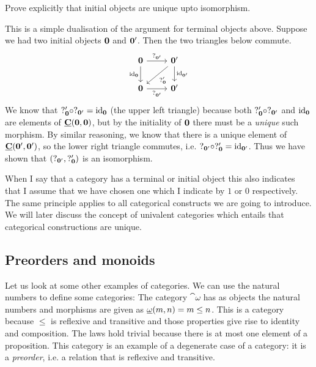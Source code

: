 \begin{Exercise}
  Prove explicitly that initial objects are unique upto isomorphism.
\end{Exercise}
\begin{Answer}
  This is a simple dualisation of the argument for terminal objects above. Suppose we had two initial objects $\bf{0}$ and $\bf{0'}$. Then the two triangles below commute.
  \[\begin{tikzcd}
      \bf{0} \arrow{r}{?_{\bf{0'}}} \arrow[swap]{d}{\id_{\bf 0}} & \bf{0'} \arrow{d}{\id_{\bf 0'}} \arrow{dl}{?'_{\bf{0}}} \\
      \bf{0} \arrow[swap]{r}{?_{\bf{0'}}} & \bf{0'}
  \end{tikzcd}\]
  We know that $?'_{\bf 0}\circ ?_{\bf 0'}=\mathrm{id}_{\bf 0}$ (the upper left triangle) because both $?'_{\bf 0}\circ ?_{\bf 0'}$ and $\mathrm{id}_{\bf 0}$ are elements of $\underline{\mathbf{C}}({\bf 0}, {\bf 0})$, but by the initiality of $\bf{0}$ there must be a \emph{unique} such morphism. By similar reasoning, we know that there is a unique element of $\underline{\mathbf{C}}({\bf 0'}, {\bf 0'})$, so the lower right triangle commutes, i.e. $?_{\bf 0'}\circ ?'_{\bf 0}=\mathrm{id}_{\bf 0'}$. Thus we have shown that $(?_{\bf 0'},?'_{\bf 0})$ is an isomorphism.
\end{Answer}

When I say that a category has a terminal or initial object this also indicates that I assume that we have chosen one which I indicate by $1$ or $0$ respectively. The same principle applies to all categorical constructs we are going to introduce. We will later discuss the concept of univalent categories which entails that categorical constructions are unique.

\subsection{Preorders and monoids}
\label{sec:preorders-mnoids}

Let us look at some other examples of categories. We can use the natural numbers to define some categories: The category $\cat{\omega}$ has as objects the natural numbers and morphisms are given as $\underline{\mathbf{\omega}}(m,n) = m \leq n$. This is a category because $\leq$ is reflexive and transitive and those properties give rise to identity and composition. The laws hold trivial because there is at most one element of a proposition. This category is an example of a degenerate case of a category: it is a \emph{preorder}, i.e. a relation that is reflexive and transitive. 

